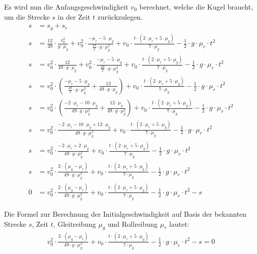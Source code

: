 Es wird nun die Anfangsgeschwindigkeit $v_0$ berechnet, welche die Kugel braucht, um die Strecke $s$ in der Zeit $t$
zurückzulegen.
\begin{align}
    s &= s_g + s_r\\
    s &= \frac{12}{49} \cdot \frac{v_0^2}{g \cdot \mu_g} + v_0^2 \cdot \frac{-\mu_r - 5 \cdot \mu_g}{\frac{49}{2} \cdot g \cdot \mu_g^2} + v_0 \cdot \frac{t \cdot (2 \cdot \mu_r + 5 \cdot \mu_g)}{7 \cdot \mu_g} - \frac{1}{2} \cdot g \cdot \mu_r \cdot t^2\\
    s &= v_0^2 \cdot \frac{12}{49 \cdot g \cdot \mu_g} + v_0^2 \cdot \frac{-\mu_r - 5 \cdot \mu_g}{\frac{49}{2} \cdot g \cdot \mu_g^2} + v_0 \cdot \frac{t \cdot (2 \cdot \mu_r + 5 \cdot \mu_g)}{7 \cdot \mu_g} - \frac{1}{2} \cdot g \cdot \mu_r \cdot t^2\\
    s &= v_0^2 \cdot (\frac{-\mu_r - 5 \cdot \mu_g}{\frac{49}{2} \cdot g \cdot \mu_g^2} + \frac{12}{49 \cdot g \cdot \mu_g}) + v_0 \cdot \frac{t \cdot (2 \cdot \mu_r + 5 \cdot \mu_g)}{7 \cdot \mu_g} - \frac{1}{2} \cdot g \cdot \mu_r \cdot t^2\\
    s &= v_0^2 \cdot (\frac{-2 \cdot \mu_r - 10 \cdot \mu_g}{49 \cdot g \cdot \mu_g^2} + \frac{12 \cdot \mu_g}{49 \cdot g \cdot \mu_g^2}) + v_0 \cdot \frac{t \cdot (2 \cdot \mu_r + 5 \cdot \mu_g)}{7 \cdot \mu_g} - \frac{1}{2} \cdot g \cdot \mu_r \cdot t^2\\
    s &= v_0^2 \cdot \frac{-2 \cdot \mu_r - 10 \cdot \mu_g + 12 \cdot \mu_g}{49 \cdot g \cdot \mu_g^2} + v_0 \cdot \frac{t \cdot (2 \cdot \mu_r + 5 \cdot \mu_g)}{7 \cdot \mu_g} - \frac{1}{2} \cdot g \cdot \mu_r \cdot t^2\\
    s &= v_0^2 \cdot \frac{-2 \cdot \mu_r + 2 \cdot \mu_g}{49 \cdot g \cdot \mu_g^2} + v_0 \cdot \frac{t \cdot (2 \cdot \mu_r + 5 \cdot \mu_g)}{7 \cdot \mu_g} - \frac{1}{2} \cdot g \cdot \mu_r \cdot t^2\\
    s &= v_0^2 \cdot \frac{2 \cdot (\mu_g - \mu_r)}{49 \cdot g \cdot \mu_g^2} + v_0 \cdot \frac{t \cdot (2 \cdot \mu_r + 5 \cdot \mu_g)}{7 \cdot \mu_g} - \frac{1}{2} \cdot g \cdot \mu_r \cdot t^2\\
    0 &= v_0^2 \cdot \frac{2 \cdot (\mu_g - \mu_r)}{49 \cdot g \cdot \mu_g^2} + v_0 \cdot \frac{t \cdot (2 \cdot \mu_r + 5 \cdot \mu_g)}{7 \cdot \mu_g} - \frac{1}{2} \cdot g \cdot \mu_r \cdot t^2 - s
\end{align}

Die Formel zur Berechnung der Initialgeschwindigkeit auf Basis der bekannten Strecke $s$, Zeit $t$, Gleitreibung $\mu_g$ und
Rollreibung $\mu_r$ lautet:
\begin{align}
    v_0^2 \cdot \frac{2 \cdot (\mu_g - \mu_r)}{49 \cdot g \cdot \mu_g^2} + v_0 \cdot \frac{t \cdot (2 \cdot \mu_r + 5 \cdot \mu_g)}{7 \cdot \mu_g} - \frac{1}{2} \cdot g \cdot \mu_r \cdot t^2 - s = 0
\end{align}

